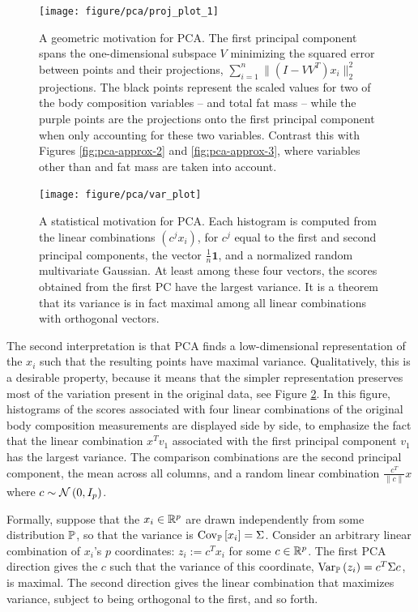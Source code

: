 \documentclass{article}
\begin{document}
\begin{figure}
  \texttt{[image: figure/pca/proj\_plot\_1]}
  \caption{A geometric motivation for PCA. The first principal component spans
    the one-dimensional subspace $V$ minimizing the squared error between points
    and their projections, $\sum_{i = 1}^{n}\|\left(I -
    VV^{T}\right)x_{i}\|_{2}^{2}$ projections. The black points represent the
    scaled values for two of the body composition variables --  and total
    fat mass -- while the purple points are the projections onto the first
    principal component when only accounting for these two variables. Contrast
    this with Figures \ref{fig:pca-approx-2} and \ref{fig:pca-approx-3}, where
    variables other than  and fat mass are taken into account.}
  \label{fig:pca-approx}
\end{figure}

\begin{figure}
  \texttt{[image: figure/pca/var\_plot]}
  \caption{A statistical motivation for PCA. Each histogram is computed from the
    linear combinations $\left(c^{j}x_{i}\right)$, for $c^{j}$ equal to the
    first and second principal components, the vector $\frac{1}{n}\mathbf{1}$,
    and a normalized random multivariate Gaussian. At least among these four
    vectors, the scores obtained from the first PC have the largest variance. It
    is a theorem that its variance is in fact maximal among all linear
    combinations with orthogonal vectors.}
  \label{fig:pca-var}
\end{figure}

The second interpretation is that PCA finds a low-dimensional representation of
the $x_{i}$ such that the resulting points have maximal variance. Qualitatively,
this is a desirable property, because it means that the simpler representation
preserves most of the variation present in the original data, see Figure
\ref{fig:pca-var}. In this figure, histograms of the scores associated with four
linear combinations of the original body composition measurements are displayed
side by side, to emphasize the fact that the linear combination $x^{T}v_{1}$
associated with the first principal component $v_{1}$ has the largest variance.
The comparison combinations are the second principal component, the mean across
all columns, and a random linear combination $\frac{c^{T}}{\|c\|} x$ where $c \sim
\Gsn\left(0, I_{p}\right)$.

Formally, suppose that the $x_{i}\in\reals^{p}$ are drawn
independently from some distribution $\P$, so that the variance is
$\Covsubarg{\P}{x_{i}} = \Sigma$. Consider an arbitrary linear combination of
$x_{i}$'s $p$ coordinates: $z_{i} := c^{T}x_{i}$ for some $c \in \reals^{p}$.
The first PCA direction gives the $c$ such that the variance of this coordinate,
$\Varsubarg{\P}{z_{i}} = c^{T}\Sigma c$, is maximal. The second direction gives
the linear combination that maximizes variance, subject to being orthogonal to
the first, and so forth.
\end{document}
